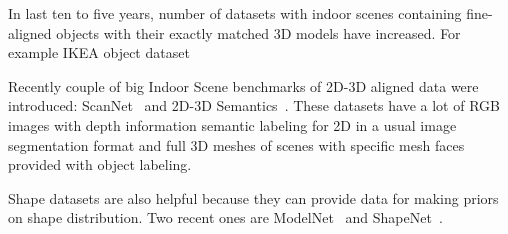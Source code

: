 
In last ten to five years, number of datasets with indoor scenes containing fine-aligned objects with their exactly matched 3D models have increased. For example IKEA object dataset~\cite{lim2013parsing}

Recently couple of big Indoor Scene benchmarks of 2D-3D aligned data were introduced: ScanNet~\cite{dai2017scannet} and 2D-3D Semantics~\cite{armeni2017joint}. These datasets have a lot of RGB images with depth information semantic labeling for 2D in a usual image segmentation format and full 3D meshes of scenes with specific mesh faces provided with object labeling.

Shape datasets are also helpful because they can provide data for making priors on shape distribution. Two recent ones are ModelNet~\cite{wu20153d} and ShapeNet~\cite{chang2015shapenet}.

